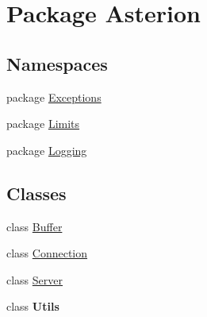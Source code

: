 \hypertarget{namespaceAsterion}{\section{Package Asterion}
\label{namespaceAsterion}
}
\subsection*{Namespaces}
\begin{DoxyCompactItemize}
\item 
package \hyperlink{namespaceAsterion_1_1Exceptions}{Exceptions}
\item 
package \hyperlink{namespaceAsterion_1_1Limits}{Limits}
\item 
package \hyperlink{namespaceAsterion_1_1Logging}{Logging}
\end{DoxyCompactItemize}
\subsection*{Classes}
\begin{DoxyCompactItemize}
\item 
class \hyperlink{classAsterion_1_1Buffer}{Buffer}
\item 
class \hyperlink{classAsterion_1_1Connection}{Connection}
\item 
class \hyperlink{classAsterion_1_1Server}{Server}
\item 
class {\bfseries Utils}
\end{DoxyCompactItemize}

